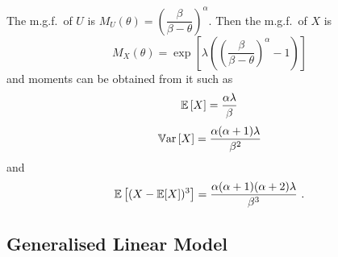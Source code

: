 The m.g.f.~of $U$ is $M_U(\theta) = \left(\dfrac{\beta}{\beta-\theta}\right)^\alpha$. Then the m.g.f.~of $X$ is
\begin{equation}
  M_X(\theta)=\exp\left[\lambda\left(\left(\frac{\beta}{\beta-\theta}\right)^{\alpha}-1\right)\right]
\end{equation}
and moments can be obtained from it such as
\begin{equation}
  \operatorname{\mathbb{E}}\left[X\right]=\frac{\alpha\lambda}{\beta}
\end{equation}
\begin{equation}
  \operatorname{\mathbb{V}ar}\left[X\right]=\frac{\alpha(\alpha+1)\lambda}{\beta^2}
  \label{eq:compoundPoisson_variance}
\end{equation}
and
\begin{equation}
  \operatorname{\mathbb{E}}\left[(X-\operatorname{\mathbb{E}}[X])^3\right] = \frac{\alpha(\alpha+1)(\alpha+2)\lambda}{\beta^3}
  \ .
\end{equation}

\subsection{Generalised Linear Model}

